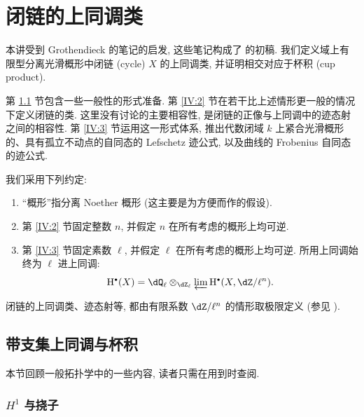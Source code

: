 
\chapter[{闭链的上同调类 [Cycle]}]{闭链的上同调类}\label{IV}

本讲受到 Grothendieck 的笔记的启发, 这些笔记构成了 \cite[IV]{sga5} 的初稿.
我们定义域上有限型分离光滑概形中闭链 (cycle) $X$ 的上同调类,
并证明相交对应于杯积 (cup product).

第 \ref{IV:1} 节包含一些一般性的形式准备. 第 \ref{IV:2} 节在若干比上述情形更一般的情况下定义闭链的类.
这里没有讨论的主要相容性, 是闭链的正像与上同调中的迹态射之间的相容性.
第 \ref{IV:3} 节运用这一形式体系, 推出代数闭域 $k$ 上紧合光滑概形的、具有孤立不动点的自同态的 Lefschetz 迹公式,
以及曲线的 Frobenius 自同态的迹公式.

我们采用下列约定:
\begin{enumerate}[\indent 1)]
  \item “概形”指分离 Noether 概形 (这主要是为方便而作的假设).
  \item 第 \ref{IV:2} 节固定整数 $n$, 并假定 $n$ 在所有考虑的概形上均可逆.
  \item 第 \ref{IV:3} 节固定素数 $\ell$, 并假定 $\ell$ 在所有考虑的概形上均可逆.
    所用上同调始终为 $\ell$ 进上同调:
    \[
      \h^\bullet(X) = \dQ_\ell\otimes_{\dZ_\ell} \varprojlim \h^\bullet(X,\dZ/\ell^n) \text{.}
    \]
\end{enumerate}
闭链的上同调类、迹态射等, 都由有限系数 $\dZ/\ell^n$ 的情形取极限定义 (参见 \cite[VI]{sga5}).



\section{带支集上同调与杯积}\label{IV:1}

本节回顾一般拓扑学中的一些内容, 读者只需在用到时查阅.

\subsection{\texorpdfstring{$H^1$}{H1} 与挠子}\label{IV:1-1}

\subsubsection{}\label{IV:1-1-1}


